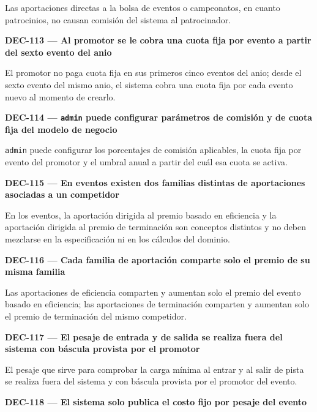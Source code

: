 \documentclass[10pt,letterpaper]{article}
\begin{document}
Las aportaciones directas a la bolsa de eventos o campeonatos, en cuanto patrocinios, no causan comisión del sistema al patrocinador.\par\vspace{0.45em}
\noindent\textbf{DEC-113 --- Al promotor se le cobra una cuota fija por evento a partir del sexto evento del anio}\par
El promotor no paga cuota fija en sus primeros cinco eventos del anio; desde el sexto evento del mismo anio, el sistema cobra una cuota fija por cada evento nuevo al momento de crearlo.\par\vspace{0.45em}
\noindent\textbf{DEC-114 --- \texttt{admin} puede configurar parámetros de comisión y de cuota fija del modelo de negocio}\par
\texttt{admin} puede configurar los porcentajes de comisión aplicables, la cuota fija por evento del promotor y el umbral anual a partir del cuál esa cuota se activa.\par\vspace{0.45em}
\noindent\textbf{DEC-115 --- En eventos existen dos familias distintas de aportaciones asociadas a un competidor}\par
En los eventos, la aportación dirigida al premio basado en eficiencia y la aportación dirigida al premio de terminación son conceptos distintos y no deben mezclarse en la especificación ni en los cálculos del dominio.\par\vspace{0.45em}
\noindent\textbf{DEC-116 --- Cada familia de aportación comparte solo el premio de su misma familia}\par
Las aportaciones de eficiencia comparten y aumentan solo el premio del evento basado en eficiencia; las aportaciones de terminación comparten y aumentan solo el premio de terminación del mismo competidor.\par\vspace{0.45em}
\noindent\textbf{DEC-117 --- El pesaje de entrada y de salida se realiza fuera del sistema con báscula provista por el promotor}\par
El pesaje que sirve para comprobar la carga mínima al entrar y al salir de pista se realiza fuera del sistema y con báscula provista por el promotor del evento.\par\vspace{0.45em}
\noindent\textbf{DEC-118 --- El sistema solo publica el costo fijo por pesaje del evento}\par
\end{document}
